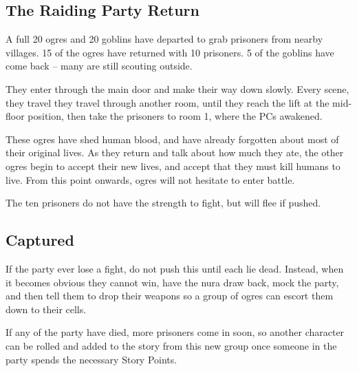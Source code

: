\begin{multicols}{2}


\subsection{The Raiding Party Return}
\label{raidingParty}

A full 20 ogres and 20 goblins have departed to grab prisoners from nearby villages.
15 of the ogres have returned with 10 prisoners.
5 of the goblins have come back -- many are still scouting outside.

They enter through the main door and make their way down slowly.
Every scene, they travel they travel through another room, until they reach the lift at the mid-floor position, then take the prisoners to room 1, where the PCs awakened.

These ogres have shed human blood, and have already forgotten about most of their original lives.
As they return and talk about how much they ate, the other ogres begin to accept their new lives, and accept that they must kill humans to live.
From this point onwards, ogres will not hesitate to enter battle.




The ten prisoners do not have the strength to fight, but will flee if pushed.

\subsection{Captured}

If the party ever lose a fight, do not push this until each lie dead.
Instead, when it becomes obvious they cannot win, have the nura draw back, mock the party, and then tell them to drop their weapons so a group of ogres can escort them down to their cells.

If any of the party have died, more prisoners come in soon, so another character can be rolled and added to the story from this new group once someone in the party spends the necessary Story Points.

\end{multicols}
